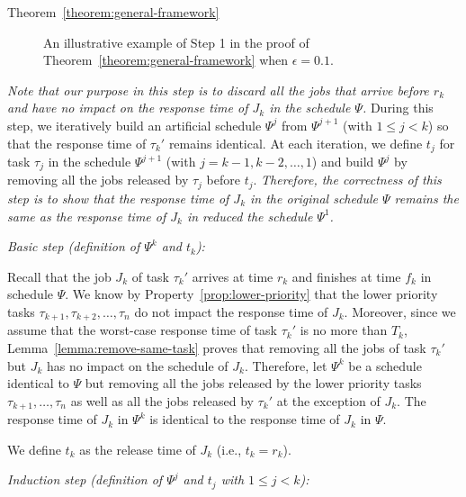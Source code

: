 \begin{appProof}{Theorem~\ref{theorem:general-framework}}


\begin{figure*}[t]
  \centering
\caption{An illustrative example of Step 1 in the proof of Theorem~\ref{theorem:general-framework} when $\epsilon = 0.1$.}
\label{fig:example}  
\end{figure*}



\emph{Note that our purpose in this step is to discard all the jobs that arrive before $r_k$ and have no impact on the response time of $J_k$ in the schedule
  $\Psi$. } During this step, we iteratively build an artificial schedule $\Psi^j$ from $\Psi^{j+1}$ (with $1 \leq j < k$) so that the response time of $\tau_{k}'$ remains identical. At each iteration, we define $t_j$ for task $\tau_j$ in the schedule $\Psi^{j+1}$ (with $j=k-1, k-2, \ldots, 1$) and build $\Psi^j$ by removing all the jobs released by $\tau_j$ before $t_j$. \emph{Therefore, the correctness of this step is to show that the response time of $J_k$ in the original schedule $\Psi$ remains the same as the response time of $J_k$ in reduced the schedule $\Psi^1$.}


\noindent\textit{Basic step (definition of $\Psi^k$ and $t_k$):} 

Recall that the job $J_{k}$ of task $\tau_k'$ arrives at time $r_k$ and finishes at time $f_k$ in schedule $\Psi$. We know by Property~\ref{prop:lower-priority} that the lower priority tasks $\tau_{k+1}, \tau_{k+2}, \ldots, \tau_n$ do not impact the response time of $J_{k}$. Moreover, since we assume that the worst-case response time of task $\tau_k'$ is no more than $T_k$, Lemma~\ref{lemma:remove-same-task} proves that removing all the jobs of task $\tau_k'$ but $J_{k}$ has no impact on the schedule of $J_{k}$. Therefore, let $\Psi^k$ be a schedule identical to $\Psi$ but removing all the jobs released by the lower priority tasks $\tau_{k+1}, \ldots, \tau_n$ as well as all the jobs released by $\tau_k'$ at the exception of $J_{k}$. The response time of $J_{k}$ in $\Psi^{k}$ is identical to the response time of $J_{k}$ in $\Psi$.

We define $t_k$ as the release time of $J_k$ (i.e., $t_k = r_k$).


\noindent\textit{Induction step (definition of $\Psi^j$ and $t_j$ with $1 \leq j < k$):}


\end{appProof}

